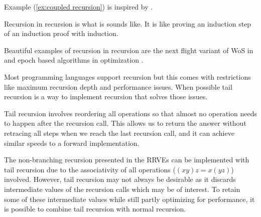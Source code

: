 \documentclass[a4paper,12pt]{article}
\begin{document}
\begin{related}
    Example (\ref{ex:coupled recursion}) is inspired by \cite{vicini_path_2021}.
\end{related}

\begin{technique}\label{tech:recu in recu}
    Recursion in recursion is what is sounds like. It is like proving an induction
    step of an induction proof with induction.
\end{technique}


\begin{related}
    Beautiful examples of recursion in recursion are
    the next flight variant of WoS in
    \cite{sawhney_grid-free_2022} and epoch based algorithms in optimization
    \cite{gupta_convergence_2021}.
\end{related}

Most programming languages support recursion but this comes with restrictions
like maximum recursion depth and performance issues. When possible tail recursion is
a way to implement recursion that solves those
issues.

\begin{technique}
    Tail recursion involves reordering all operations
    so that almost no operation needs to happen after
    the recursion call. This allows us to return the
    answer without retracing all steps when we reach
    the last recursion call, and it can achieve similar
    speeds to a forward implementation.
\end{technique}

The non-branching recursion presented in the RRVEs
can be implemented with tail recursion due to the associativity of
all operations ($(xy)z = x(yz)$) involved. However, tail recursion
may not always be desirable as it discards intermediate values of
the recursion calls which may be of interest. To retain some of these intermediate
values while still partly optimizing for performance, it is possible
to combine tail recursion with normal recursion.
\end{document}
